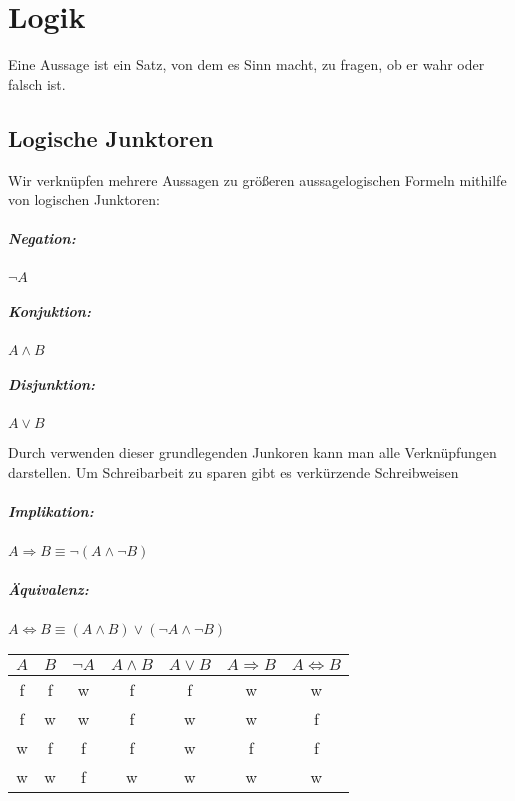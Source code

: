 \chapter{Logik}
Eine Aussage ist ein Satz, von dem es Sinn macht, zu fragen, ob er wahr oder falsch ist.

\section{Logische Junktoren}
Wir verknüpfen mehrere Aussagen zu größeren aussagelogischen Formeln mithilfe von logischen Junktoren:
\begin{multicols}{3}
  \paragraph{Negation:}
  $\neg A$
  \columnbreak
  \paragraph{Konjuktion:}
  $A \wedge B$
  \columnbreak
  \paragraph{Disjunktion:}
  $A \vee B$
\end{multicols}
Durch verwenden dieser grundlegenden Junkoren kann man alle Verknüpfungen darstellen. Um Schreibarbeit zu sparen gibt es verkürzende Schreibweisen

\paragraph{Implikation:}
$A\Rightarrow B \equiv \neg(A\wedge \neg B)$
\paragraph{Äquivalenz:}
$A\Leftrightarrow B \equiv (A\wedge B)\vee (\neg A\wedge \neg B)$

\vspace{1em}
\begin{center}
  \begin{tabular}{c|c||c|c|c|c|c}
    $A$ & $B$ & $\neg A$ & $A \wedge B$ & $A \vee B$ & $A \Rightarrow B$ & $A \Leftrightarrow B$\\
    \hline  f & f & w & f & f & w & w \\
            f & w & w & f & w & w & f \\
            w & f & f & f & w & f & f \\
            w & w & f & w & w & w & w
  \end{tabular}
\end{center}



